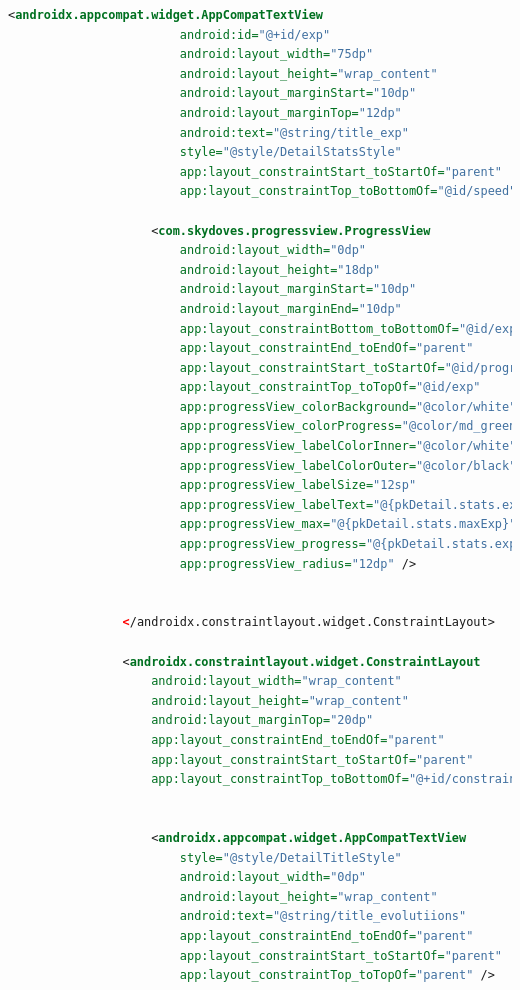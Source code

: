 \documentclass[a4paper, 12pt]{article}
\begin{document}
\begin{lstlisting}[caption={Pokemon Detail Layout.}, label={layout:pk_detail}, language=XML]
                    <androidx.appcompat.widget.AppCompatTextView
                        android:id="@+id/exp"
                        android:layout_width="75dp"
                        android:layout_height="wrap_content"
                        android:layout_marginStart="10dp"
                        android:layout_marginTop="12dp"
                        android:text="@string/title_exp"
                        style="@style/DetailStatsStyle"
                        app:layout_constraintStart_toStartOf="parent"
                        app:layout_constraintTop_toBottomOf="@id/speed" />
    
                    <com.skydoves.progressview.ProgressView
                        android:layout_width="0dp"
                        android:layout_height="18dp"
                        android:layout_marginStart="10dp"
                        android:layout_marginEnd="10dp"
                        app:layout_constraintBottom_toBottomOf="@id/exp"
                        app:layout_constraintEnd_toEndOf="parent"
                        app:layout_constraintStart_toStartOf="@id/progress_hp"
                        app:layout_constraintTop_toTopOf="@id/exp"
                        app:progressView_colorBackground="@color/white"
                        app:progressView_colorProgress="@color/md_green_200"
                        app:progressView_labelColorInner="@color/white"
                        app:progressView_labelColorOuter="@color/black"
                        app:progressView_labelSize="12sp"
                        app:progressView_labelText="@{pkDetail.stats.exp}"
                        app:progressView_max="@{pkDetail.stats.maxExp}"
                        app:progressView_progress="@{pkDetail.stats.exp}"
                        app:progressView_radius="12dp" />
    
    
                </androidx.constraintlayout.widget.ConstraintLayout>
    
                <androidx.constraintlayout.widget.ConstraintLayout
                    android:layout_width="wrap_content"
                    android:layout_height="wrap_content"
                    android:layout_marginTop="20dp"
                    app:layout_constraintEnd_toEndOf="parent"
                    app:layout_constraintStart_toStartOf="parent"
                    app:layout_constraintTop_toBottomOf="@+id/constraintLayout3">
    
    
                    <androidx.appcompat.widget.AppCompatTextView
                        style="@style/DetailTitleStyle"
                        android:layout_width="0dp"
                        android:layout_height="wrap_content"
                        android:text="@string/title_evolutiions"
                        app:layout_constraintEnd_toEndOf="parent"
                        app:layout_constraintStart_toStartOf="parent"
                        app:layout_constraintTop_toTopOf="parent" />
    

\end{lstlisting}
\end{document}
